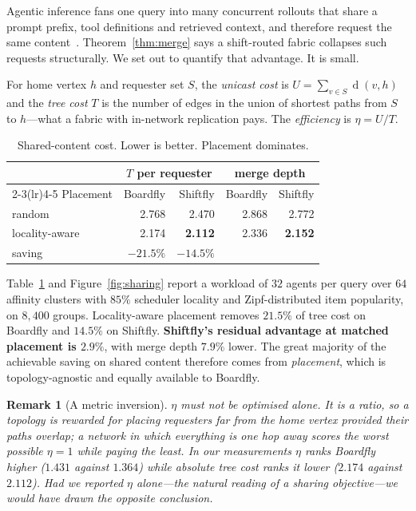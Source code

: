 \documentclass[sigconf,nonacm]{acmart}
\theoremstyle{acmdefinition}%
\newtheorem{remark}[theorem]{Remark}%
\newcommand{\dist}{\operatorname{d}}
\begin{document}
Agentic inference fans one query into many concurrent rollouts that share a
prompt prefix, tool definitions and retrieved context, and therefore request the
same content~\cite{zheng2024sglang,qin2025mooncake,wang2023selfconsistency}.
Theorem~\ref{thm:merge} says a shift-routed fabric collapses such requests
structurally. We set out to quantify that advantage. It is small.

\begin{definition}
For home vertex $h$ and requester set $S$, the \emph{unicast cost} is
$U=\sum_{v\in S}\dist(v,h)$ and the \emph{tree cost} $T$ is the number of edges
in the union of shortest paths from $S$ to $h$---what a fabric with in-network
replication pays. The \emph{efficiency} is $\eta=U/T$.
\end{definition}

\begin{table}[t]
\centering\small
\begin{tabular}{lrrrr}
\toprule
& \multicolumn{2}{c}{$T$ per requester} & \multicolumn{2}{c}{merge depth}\\
\cmidrule(lr){2-3}\cmidrule(lr){4-5}
Placement & Boardfly & Shiftfly & Boardfly & Shiftfly\\
\midrule
random & 2.768 & 2.470 & 2.868 & 2.772 \\
locality-aware & 2.174 & \textbf{2.112} & 2.336 & \textbf{2.152} \\
\midrule
saving & $-21.5\%$ & $-14.5\%$ & & \\
\bottomrule
\end{tabular}
\caption{Shared-content cost. Lower is better. Placement dominates.}
\label{tab:sharing}
\end{table}

Table~\ref{tab:sharing} and Figure~\ref{fig:sharing} report a workload of $32$
agents per query over $64$ affinity clusters with $85\%$ scheduler locality and
Zipf-distributed item popularity, on $8{,}400$ groups. Locality-aware placement
removes $21.5\%$ of tree cost on Boardfly and $14.5\%$ on Shiftfly.
\textbf{Shiftfly's residual advantage at matched placement is $2.9\%$}, with
merge depth $7.9\%$ lower. The great majority of the achievable saving on shared
content therefore comes from \emph{placement}, which is topology-agnostic and
equally available to Boardfly.

\begin{remark}[A metric inversion]
\label{rem:trap}
$\eta$ must not be optimised alone. It is a ratio, so a topology is rewarded for
placing requesters \emph{far} from the home vertex provided their paths overlap;
a network in which everything is one hop away scores the worst possible $\eta=1$
while paying the least. In our measurements $\eta$ ranks Boardfly \emph{higher}
($1.431$ against $1.364$) while absolute tree cost ranks it \emph{lower}
($2.174$ against $2.112$). Had we reported $\eta$ alone---the natural reading of
a sharing objective---we would have drawn the opposite conclusion.
\end{remark}
\end{document}
